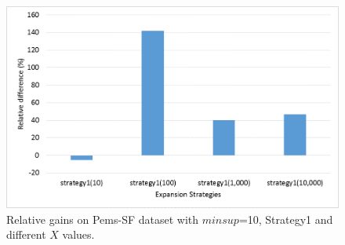 %
%
%
%

\begin{figure}[!t]
\includegraphics[width=5in]{immagini_extension/pems_strategy1.png}
\caption{Relative gains on Pems-SF dataset with $minsup$=10, Strategy1 and different $X$ values.
}
\label{pems_strategy1}
\end{figure}

